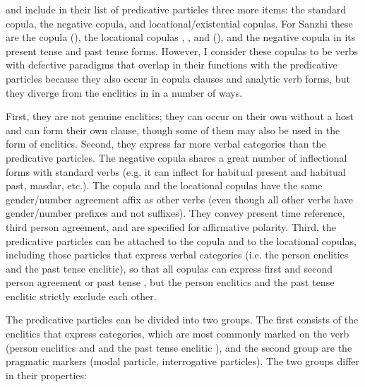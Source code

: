 \citet[138]{Sumbatova.Mutalov2003} and \citet[153]{Sumbatova.Lander2014} include in their list of predicative particles three more items: the standard copula, the negative copula, and locational/existential copulas. For Sanzhi these are the copula  (), the locational copulas , ,  and  (), and the negative copula  in its present tense and past tense forms. However, I consider these copulas to be verbs with defective paradigms that overlap in their functions with the predicative particles because they also occur in copula clauses and analytic verb forms, but they diverge from the enclitics in  in a number of ways.

First, they are not genuine enclitics; they can occur on their own without a host and can form their own clause, though some of them may also be used in the form of enclitics. Second, they express far more verbal categories than the predicative particles. The negative copula shares a great number of inflectional forms with standard verbs (e.g. it can inflect for habitual present and habitual past, masdar, etc.). The copula and the locational copulas have the same gender/number agreement affix as other verbs (even though all other verbs have gender/number prefixes and not suffixes). They convey present time reference, third person agreement, and are specified for affirmative polarity. Third, the predicative particles can be attached to the copula and to the locational copulas, including those particles that express verbal categories (i.e. the person enclitics and the past tense enclitic), so that all copulas can express first and second person agreement or past tense , but the person enclitics and the past tense enclitic strictly exclude each other.

The predicative particles can be divided into two groups. The first consists of the enclitics that express categories, which are most commonly marked on the verb (person enclitics  and  and the past tense enclitic ), and the second group are the pragmatic markers (modal particle, interrogative particles). The two groups differ in their properties:

